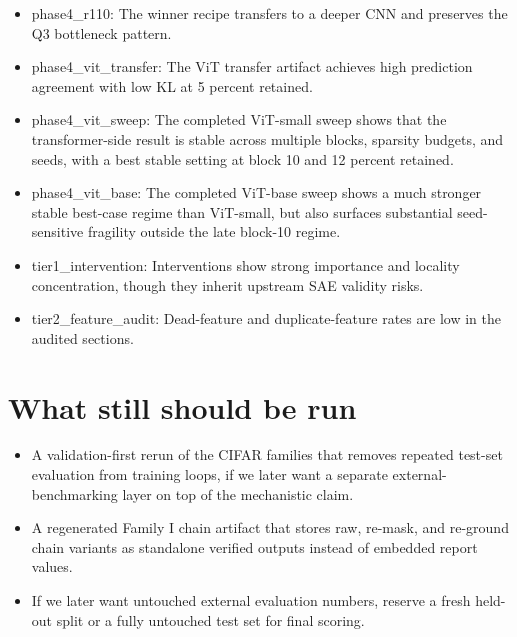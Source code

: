 \documentclass[11pt]{article}
\begin{document}
\begin{itemize}
\item phase4\_r110: The winner recipe transfers to a deeper CNN and preserves the Q3 bottleneck pattern.
\item phase4\_vit\_transfer: The ViT transfer artifact achieves high prediction agreement with low KL at 5 percent retained.
\item phase4\_vit\_sweep: The completed ViT-small sweep shows that the transformer-side result is stable across multiple blocks, sparsity budgets, and seeds, with a best stable setting at block 10 and 12 percent retained.
\item phase4\_vit\_base: The completed ViT-base sweep shows a much stronger stable best-case regime than ViT-small, but also surfaces substantial seed-sensitive fragility outside the late block-10 regime.
\item tier1\_intervention: Interventions show strong importance and locality concentration, though they inherit upstream SAE validity risks.
\item tier2\_feature\_audit: Dead-feature and duplicate-feature rates are low in the audited sections.
\end{itemize}
\section{What still should be run}
\begin{itemize}
\item A validation-first rerun of the CIFAR families that removes repeated test-set evaluation from training loops, if we later want a separate external-benchmarking layer on top of the mechanistic claim.
\item A regenerated Family I chain artifact that stores raw, re-mask, and re-ground chain variants as standalone verified outputs instead of embedded report values.
\item If we later want untouched external evaluation numbers, reserve a fresh held-out split or a fully untouched test set for final scoring.
\end{itemize}
\end{document}

